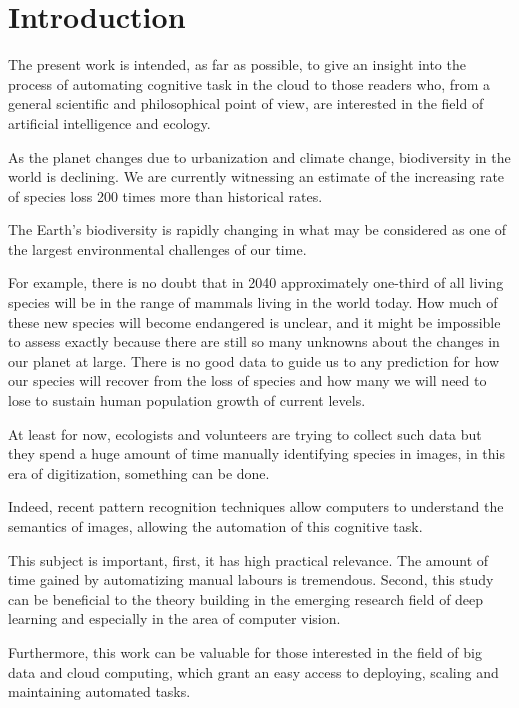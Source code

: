 
\chapter{Introduction}

The present work is intended, as far as possible, to give an insight into the process of automating cognitive task in the cloud to those readers who, from a general scientific and philosophical point of view, are interested in the field of artificial intelligence and ecology.


As the planet changes due to urbanization and climate change, biodiversity in the world is declining. We are currently witnessing an estimate of the increasing rate of species loss 200 times more than historical rates\cite{cop21_1}. 

The Earth's biodiversity is rapidly changing in what may be considered as one of the largest environmental challenges of our time.

For example, there is no doubt that in 2040 approximately one-third of all living species will be in the range of mammals living in the world today. How much of these new species will become endangered is unclear, and it might be impossible to assess exactly because there are still so many unknowns about the changes in our planet at large. There is no good data to guide us to any prediction for how our species will recover from the loss of species and how many we will need to lose to sustain human population growth of current levels.

At least for now, ecologists and volunteers are trying to collect such data but they spend a huge amount of time manually identifying species in images, in this era of digitization, something can be done.

Indeed, recent pattern recognition techniques allow computers to understand the semantics of images, allowing the automation of this cognitive task.


This subject is important, first, it has high practical relevance. The amount of time gained by automatizing manual labours is tremendous. Second, this study can be beneficial to the theory building in the emerging research field of deep learning and especially in the area of computer vision.

Furthermore, this work can be valuable for those interested in the field of big data and cloud computing, which grant an easy access to deploying, scaling and maintaining automated tasks.


